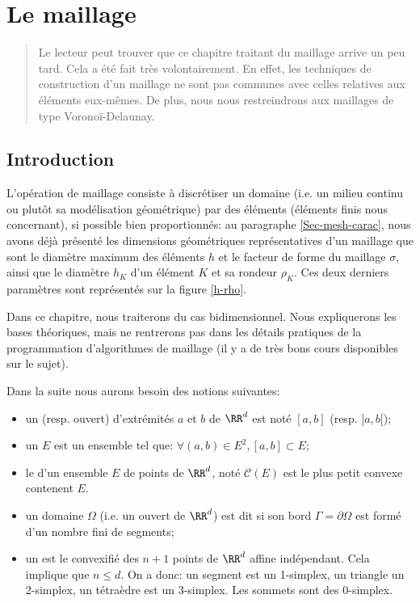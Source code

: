 \chapter{Le maillage}\label{Ch-mesh}
\begin{abstract}
Le lecteur peut trouver que ce chapitre traitant du maillage arrive un peu tard.
Cela a été fait très volontairement. En effet, les techniques de construction d'un maillage ne sont pas communes
avec celles relatives aux éléments eux-mêmes.
De plus, nous nous restreindrons aux maillages de type Voronoï-Delaunay.
\end{abstract}

\medskip
\section{Introduction}

L'opération de maillage consiste à discrétiser un domaine (i.e. un milieu continu ou plutôt sa modélisation géométrique) par des éléments 
(éléments finis nous concernant), si possible bien proportionnés: 
au paragraphe \ref{Sec-mesh-carac}, nous avons déjà présenté les dimensions géométriques représentatives d'un maillage que sont 
le diamètre maximum des éléments $h$ et le facteur de forme du maillage 
$\sigma$, ainsi que le diamètre $h_K$ d'un élément $K$ et sa rondeur $\rho_K$.
Ces deux derniers paramètres sont représentés sur la figure \ref{h-rho}. 

\medskip
Dans ce chapitre, nous traiterons du cas bidimensionnel.
Nous expliquerons les bases théoriques, mais ne rentrerons pas dans les détails pratiques de la programmation
d'algorithmes de maillage (il y a de très bons cours disponibles sur le sujet).

\medskip
Dans la suite nous aurons besoin des notions suivantes:
\begin{itemize}
   \item un  (resp. ouvert) d'extrémités $a$ et $b$ de $\RR^d$ est noté $[a,b]$ (resp. $]a,b[$);
   \item un  $E$ est un ensemble tel que: $\forall (a,b)\in E^2, [a,b]\subset E$;
   \item le  d'un ensemble $E$ de points de $\RR^d$, noté $\mathcal{C}(E)$ est le plus petit convexe
	contenent $E$.
   \item un domaine $\Omega$ (i.e. un ouvert de $\RR^d$) est dit  si son bord $\Gamma=\partial\Omega$
	est formé d'un nombre fini de segments;
   \item un  est le convexifié des $n+1$ points de $\RR^d$ affine indépendant.
	Cela implique que $n\le d$. On a donc: un segment est un 1-simplex, un triangle un 2-simplex, un tétraèdre est un 3-simplex.
	Les sommets sont des 0-simplex.
\end{itemize}


